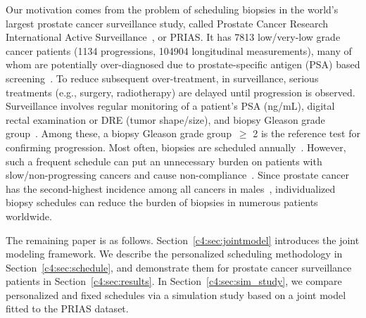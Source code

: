 Our motivation comes from the problem of scheduling biopsies in the world's largest prostate cancer surveillance study, called Prostate Cancer Research International Active Surveillance~\citep{bokhorst2015compliance}, or PRIAS. It has 7813 low/very-low grade cancer patients (1134 progressions, 104904 longitudinal measurements), many of whom are potentially over-diagnosed due to prostate-specific antigen (PSA) based screening~\citep{loeb2014overdiagnosis}. To reduce subsequent over-treatment, in surveillance, serious treatments (e.g., surgery, radiotherapy) are delayed until progression is observed. Surveillance involves regular monitoring of a patient's PSA (ng/mL), digital rectal examination or DRE (tumor shape/size), and biopsy Gleason grade group~\citep{epsteinGG2014}. Among these, a biopsy Gleason grade group~$\geq$ 2 is the reference test for confirming progression. Most often, biopsies are scheduled annually~\citep{loeb2014heterogeneity}. However, such a frequent schedule can put an unnecessary burden on patients with slow/non-progressing cancers and cause non-compliance~\citep{bokhorst2015compliance}. Since prostate cancer has the second-highest incidence among all cancers in males~\citep{GlobalCancerStats2012}, individualized biopsy schedules can reduce the burden of biopsies in numerous patients worldwide.

The remaining paper is as follows. Section~\ref{c4:sec:jointmodel} introduces the joint modeling framework. We describe the personalized scheduling methodology in Section~\ref{c4:sec:schedule}, and demonstrate them for prostate cancer surveillance patients in Section~\ref{c4:sec:results}. In Section~\ref{c4:sec:sim_study}, we compare personalized and fixed schedules via a simulation study based on a joint model fitted to the PRIAS dataset.